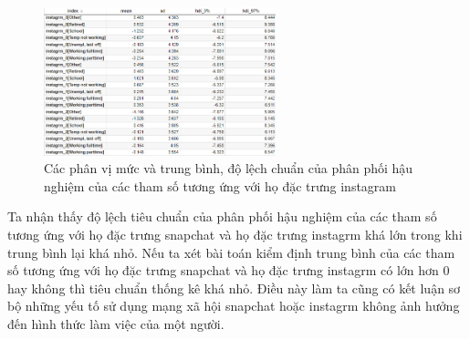 \begin{figure}[H]
    \centering
    \includegraphics[width=0.6\textwidth]{figures/Thanh/Models/Bayesian_Multi_Logit/Bayesian_email_with_null_instagrm_weights.png}
    \caption{Các phân vị mức và trung bình, độ lệch chuẩn của phân phối hậu nghiệm của các tham số tương ứng với họ đặc trưng instagram}
    \label{fig:Bayesian_email_with_null_instagrm_weights}
\end{figure}

Ta nhận thấy độ lệch tiêu chuẩn của phân phối hậu nghiệm của các tham số tương ứng với họ đặc trưng snapchat và họ đặc trưng instagrm khá lớn trong khi trung bình lại khá nhỏ.
Nếu ta xét bài toán kiểm định trung bình của các tham số tương ứng với họ đặc trưng snapchat và họ đặc trưng instagrm có lớn hơn 0 hay không thì tiêu chuẩn thống kê khá nhỏ.
Điều này làm ta cũng có kết luận sơ bộ những yếu tố sử dụng mạng xã hội snapchat hoặc instagrm không ảnh hưởng đến hình thức làm việc của một người.